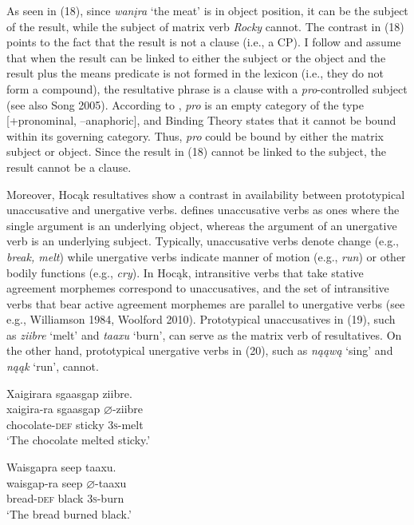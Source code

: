 \documentclass[output=paper]{LSP/langsci}
\begin{document}
As seen in (18), since \textit{wanįra} `the meat' is in object position, it can be the subject of the result, while the subject of matrix verb \textit{Rocky} cannot. The contrast in (18) points to the fact that the result is not a clause (i.e., a CP). I follow \citet{Li1999} and assume that when the result can be linked to either the subject or the object and the result plus the means predicate is not formed in the lexicon (i.e., they do not form a compound), the resultative phrase is a clause with a \textit{pro}-controlled subject (see also Song 2005). According to \citet{Chomsky1982}, \textit{pro} is an empty category of the type [+pronominal, --anaphoric], and Binding Theory states that it cannot be bound within its governing category. Thus, \textit{pro} could be bound by either the matrix subject or object. Since the result in (18) cannot be linked to the subject, the result cannot be a clause.

Moreover, Hocąk resultatives show a contrast in availability between prototypical unaccusative and unergative verbs. \citet{Perlmutter1978} defines unaccusative verbs as ones where the single argument is an underlying object, whereas the argument of an unergative verb is an underlying subject. Typically, unaccusative verbs denote change (e.g., \textit{break, melt}) while unergative verbs indicate manner of motion (e.g., \textit{run}) or other bodily functions (e.g., \textit{cry}). In Hocąk, intransitive verbs that take stative agreement morphemes correspond to unaccusatives, and the set of intransitive verbs that bear active agreement morphemes are parallel to unergative verbs (see e.g., Williamson 1984, Woolford 2010). Prototypical unaccusatives in (19), such as \textit{ziibre} `melt' and \textit{taaxu} `burn', can serve as the matrix verb of resultatives. On the other hand, prototypical unergative verbs in (20), such as \textit{nąąwą} `sing' and \textit{nąąk} `run', cannot.

\begin{exe}
\ex
\begin{xlist}

\ex \glll Xaigirara sgaasgap {ziibre}. \\
 xaigira-ra sgaasgap {$\varnothing$}-ziibre\\
chocolate-\textsc{def} sticky \textsc{3s}-melt\\
\glt `The chocolate melted sticky.'

\ex \glll Waisgapra seep {taaxu}.\\
 waisgap-ra seep {$\varnothing$}-taaxu\\
bread-\textsc{def} black \textsc{3s}-burn\\
\glt `The bread burned black.'

\end{xlist}
\end{exe}
\end{document}
